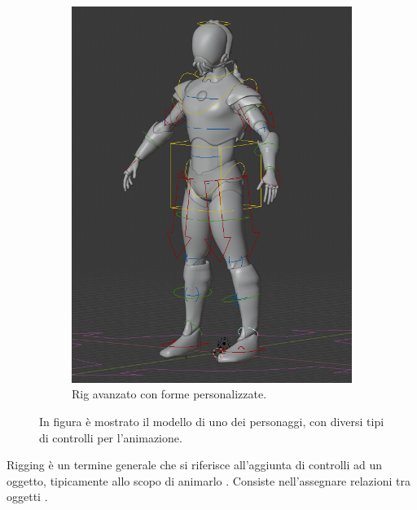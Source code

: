 \begin{figure}
\begin{subfigure}{.33\textwidth}
  \includegraphics[width=\linewidth]{Figures/rig2}
  \caption{Rig avanzato con forme personalizzate.}
  \label{fig:rig2}
\end{subfigure}
\decoRule
\caption[Rig a confronto]{In figura è mostrato il modello di uno dei personaggi, con diversi tipi di controlli per l'animazione.}
\label{fig:rig}
\end{figure}

Rigging è un termine generale che si riferisce all'aggiunta di controlli ad un oggetto, tipicamente allo scopo di animarlo \parencite{blendDoc}.
Consiste nell'assegnare relazioni tra oggetti \parencite{BlendTut}.


